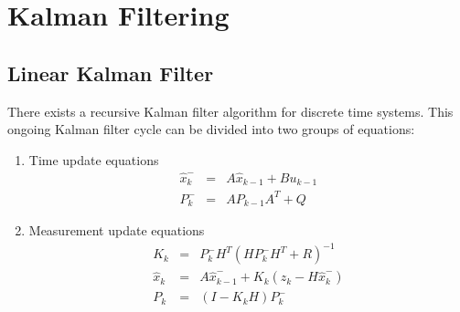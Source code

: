 \chapter{Kalman Filtering}

\section{Linear Kalman Filter}
There exists a recursive Kalman filter algorithm for discrete time systems.\cite{IntroKF} This ongoing Kalman filter cycle can be divided into two groups of equations: \newline
\begin{enumerate}
	\item Time update equations
	\begin{equation}\label{TupEq}
		\begin{aligned}
    			\hat{x}_{k}^{-} &=& A\hat{x}_{k-1}+Bu_{k-1} \\
    			P_{k}^{-} &=& AP_{k-1}A^{T}+Q
  		\end{aligned}
	\end{equation}
	\item Measurement update equations
	\begin{equation}\label{MupEq}
		\begin{aligned}
    			K_{k} &=& P_{k}^{-}H^{T}(HP_{k}^{-}H^{T}+R)^{-1} \\
    			\hat{x}_{k} &=& A\hat{x}_{k-1}^{-}+K_{k}(z_{k}-H\hat{x}_{k}^{-}) \\
			P_{k} &=& (I-K_{k}H)P_{k}^{-}
  		\end{aligned}
	\end{equation}
\end{enumerate}

